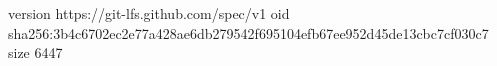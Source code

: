 version https://git-lfs.github.com/spec/v1
oid sha256:3b4c6702ec2e77a428ae6db279542f695104efb67ee952d45de13cbc7cf030c7
size 6447
